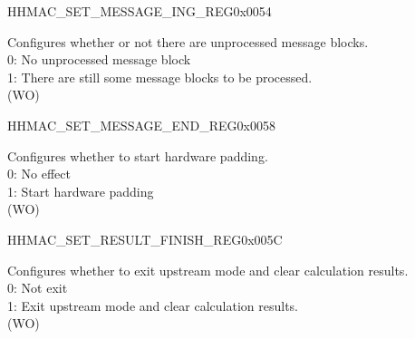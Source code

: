 \begin{register}{H}{HMAC\_SET\_MESSAGE\_ING\_REG}{0x0054}\label{regdesc:HMACSETMESSAGEINGREG}
%
%
\regnewline%
\begin{regdesc}\begin{reglist}
\label{fielddesc:HMACSETTEXTING}\item [HMAC\_SET\_TEXT\_ING] Configures whether or not there are unprocessed message blocks.
\\0: No unprocessed message block
\\1: There are still some message blocks to be processed.
\\(WO)
\end{reglist}\end{regdesc}
\end{register}


\begin{register}{H}{HMAC\_SET\_MESSAGE\_END\_REG}{0x0058}\label{regdesc:HMACSETMESSAGEENDREG}
%
%
\regnewline%
\begin{regdesc}\begin{reglist}
\label{fielddesc:HMACSETTEXTEND}\item [HMAC\_SET\_TEXT\_END] Configures whether to start hardware padding.
\\0: No effect
\\1: Start hardware padding
\\(WO)
\end{reglist}\end{regdesc}
\end{register}


\begin{register}{H}{HMAC\_SET\_RESULT\_FINISH\_REG}{0x005C}\label{regdesc:HMACSETRESULTFINISHREG}
%
%
\regnewline%
\begin{regdesc}\begin{reglist}
\label{fielddesc:HMACSETRESULTEND}\item [HMAC\_SET\_RESULT\_END] Configures whether to exit upstream mode and clear calculation results.
\\0: Not exit
\\1: Exit upstream mode and clear calculation results.
\\(WO)
\end{reglist}\end{regdesc}
\end{register}


